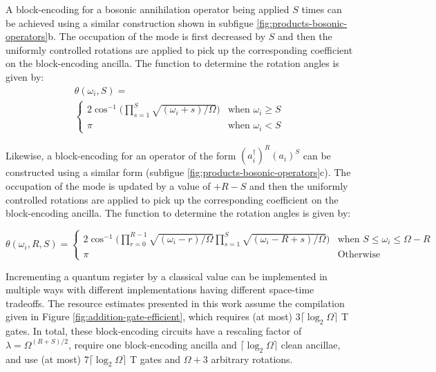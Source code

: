 A block-encoding for a bosonic annihilation operator being applied $S$ times can be achieved using a similar construction shown in subfigue \ref{fig:products-bosonic-operators}b.
The occupation of the mode is first decreased by $S$ and then the uniformly controlled rotations are applied to pick up the corresponding coefficient on the block-encoding ancilla.
The function to determine the rotation angles is given by:
\begin{equation}
    \begin{split}
        \theta(\omega_i, S) = \\
        \begin{cases} 
            2\cos^{-1}\Big(\prod_{s=1}^{S}\sqrt{(\omega_i + s) / \Omega}\Big) & \text{when } \omega_i \geq S \\
            \pi & \text{when } \omega_i < S
        \end{cases}
    \end{split}
\end{equation}

Likewise, a block-encoding for an operator of the form $(a_i^\dagger)^R (a_i)^S$ can be constructed using a similar form (subfigue \ref{fig:products-bosonic-operators}c).
The occupation of the mode is updated by a value of $+ R - S$ and then the uniformly controlled rotations are applied to pick up the corresponding coefficient on the block-encoding ancilla.
The function to determine the rotation angles is given by:
\begin{widetext}
\begin{equation}
    \theta(\omega_i, R, S) = 
    \begin{cases} 
        2\cos^{-1}\Big(\prod_{r=0}^{R-1}\sqrt{(\omega_i - r) / \Omega} \prod_{s=1}^{S}\sqrt{(\omega_i - R + s) / \Omega}\Big) & \text{when } S \leq \omega_i \leq \Omega - R \\
        \pi & \text{Otherwise} 
    \end{cases}
\end{equation}
\end{widetext}

Incrementing a quantum register by a classical value can be implemented in multiple ways with different implementations having different space-time tradeoffs.
The resource estimates presented in this work assume the compilation given in Figure \ref{fig:addition-gate-efficient}, which requires (at most) $3 \lceil \log_2 \Omega \rceil$ T gates.
In total, these block-encoding circuits have a rescaling factor of $\lambda = \Omega^{(R+S)/2}$, require one block-encoding ancilla and $\lceil{\log_2{\Omega}}\rceil$ clean ancillae, and use (at most) $7 \lceil \log_2 \Omega \rceil$ T gates and $\Omega + 3$ arbitrary rotations.


